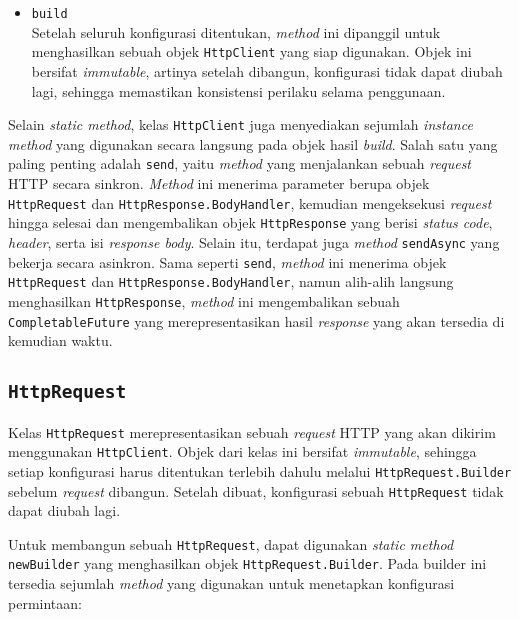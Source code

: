 \begin{itemize}
    \item \texttt{build}\\
    Setelah seluruh konfigurasi ditentukan, \textit{method} ini dipanggil untuk menghasilkan sebuah objek \texttt{HttpClient} yang siap digunakan. Objek ini bersifat \textit{immutable}, artinya setelah dibangun, konfigurasi tidak dapat diubah lagi, sehingga memastikan konsistensi perilaku selama penggunaan.
\end{itemize}

Selain \textit{static method}, kelas \texttt{HttpClient} juga menyediakan sejumlah \textit{instance method} yang digunakan secara langsung pada objek hasil \textit{build}. Salah satu yang paling penting adalah \texttt{send}, yaitu \textit{method} yang menjalankan sebuah \textit{request} HTTP secara sinkron. \textit{Method} ini menerima parameter berupa objek \texttt{HttpRequest} dan \texttt{HttpResponse.BodyHandler}, kemudian mengeksekusi \textit{request} hingga selesai dan mengembalikan objek \texttt{HttpResponse} yang berisi \textit{status code}, \textit{header}, serta isi \textit{response body}. Selain itu, terdapat juga \textit{method} \texttt{sendAsync} yang bekerja secara asinkron. Sama seperti \texttt{send}, \textit{method} ini menerima objek \texttt{HttpRequest} dan \texttt{HttpResponse.BodyHandler}, namun alih-alih langsung menghasilkan \texttt{HttpResponse}, \textit{method} ini mengembalikan sebuah \texttt{CompletableFuture} yang merepresentasikan hasil \textit{response} yang akan tersedia di kemudian waktu.



\subsection{\texttt{HttpRequest}}
\label{subsec:0228-httprequest}


Kelas \texttt{HttpRequest} merepresentasikan sebuah \textit{request} HTTP yang akan dikirim menggunakan \texttt{HttpClient}. Objek dari kelas ini bersifat \textit{immutable}, sehingga setiap konfigurasi harus ditentukan terlebih dahulu melalui \texttt{HttpRequest.Builder} sebelum \textit{request} dibangun. Setelah dibuat, konfigurasi sebuah \texttt{HttpRequest} tidak dapat diubah lagi.

Untuk membangun sebuah \texttt{HttpRequest}, dapat digunakan \textit{static method} \texttt{newBuilder} yang menghasilkan objek \texttt{HttpRequest.Builder}. Pada builder ini tersedia sejumlah \textit{method} yang digunakan untuk menetapkan konfigurasi permintaan:

